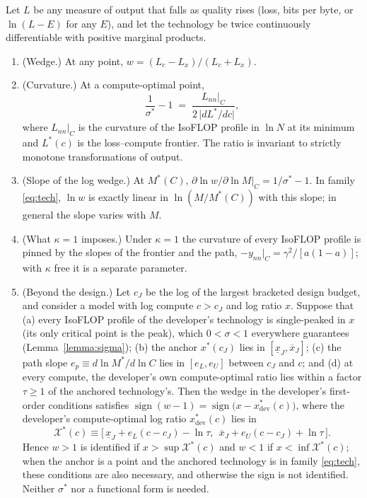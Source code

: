 \begin{proposition}\label{prop:modelfree}
Let $L$ be any measure of output that falls as quality rises (loss, bits per byte, or $\ln(L-E)$ for any $E$), and let
the technology be twice continuously differentiable with positive marginal products.
\begin{enumerate}
\item[(i)] (Wedge.) At any point, $w=(L_c-L_x)/(L_c+L_x)$.
\item[(ii)] (Curvature.) At a compute-optimal point,
\begin{equation}\label{eq:ident-mf}
\frac1{\sigma^*}-1 \;=\; \frac{L_{nn}\big|_C}{2\,\lvert dL^*/dc\rvert},
\end{equation}
where $L_{nn}|_C$ is the curvature of the IsoFLOP profile in $\ln N$ at its minimum and $L^*(c)$ is the loss--compute
frontier. The ratio is invariant to strictly monotone transformations of output.
\item[(iii)] (Slope of the log wedge.) At $M^*(C)$, $\partial\ln w/\partial\ln M|_C=1/\sigma^*-1$. In family
\eqref{eq:tech}, $\ln w$ is exactly linear in $\ln(M/M^*(C))$ with this slope; in general the slope varies with $M$.
\item[(iv)] (What $\kappa=1$ imposes.) Under $\kappa=1$ the curvature of every IsoFLOP profile is pinned by the slopes
of the frontier and the path, $-y_{nn}|_C=\gamma^2/[a(1-a)]$; with $\kappa$ free it is a separate parameter.
\item[(v)] (Beyond the design.) Let $c_J$ be the log of the largest bracketed design budget,
and consider a model with log compute $c>c_J$ and log ratio $x$. Suppose that (a) every IsoFLOP profile of the
developer's technology is single-peaked in $x$ (its only critical point is the peak), which $0<\sigma<1$ everywhere
guarantees (Lemma~\ref{lemma:sigma}); (b)
the anchor $x^*(c_J)$ lies in $[\underline x_J,\overline x_J]$; (c) the path slope $e_p\equiv d\ln M^*/d\ln C$ lies in
$[e_L,e_U]$ between $c_J$ and $c$; and (d) at every compute, the developer's own compute-optimal ratio lies within a
factor $\tau\ge1$ of the anchored technology's. Then the wedge in the developer's first-order conditions satisfies
$\operatorname{sign}(w-1)=\operatorname{sign}\big(x-x^*_{\mathrm{dev}}(c)\big)$, where the developer's compute-optimal
log ratio $x^*_{\mathrm{dev}}(c)$ lies in
\[
\mathcal X^*(c)\equiv\big[\,\underline x_J+e_L(c-c_J)-\ln\tau,\ \ \overline x_J+e_U(c-c_J)+\ln\tau\,\big].
\]
Hence $w>1$ is identified if $x>\sup\mathcal X^*(c)$ and $w<1$ if $x<\inf\mathcal X^*(c)$; when the anchor is a point
and the anchored technology is in family \eqref{eq:tech}, these conditions are also necessary, and otherwise the sign is
not identified. Neither $\sigma^*$ nor a functional form is needed.
\end{enumerate}
\end{proposition}

